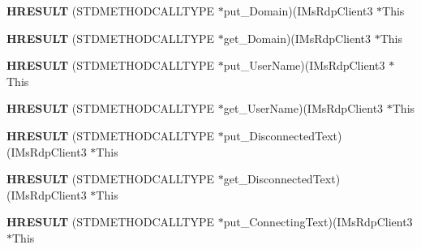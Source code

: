 \begin{DoxyCompactItemize}
\item 
\mbox{\label{struct_i_ms_rdp_client3_vtbl_a68a39d64ef2feeaec64359d9040c2900}} 
{\bfseries H\+R\+E\+S\+U\+LT} (S\+T\+D\+M\+E\+T\+H\+O\+D\+C\+A\+L\+L\+T\+Y\+PE $\ast$put\+\_\+\+Domain)(I\+Ms\+Rdp\+Client3 $\ast$This
\item 
\mbox{\label{struct_i_ms_rdp_client3_vtbl_a162188cb6b63060d59e2b48a63724153}} 
{\bfseries H\+R\+E\+S\+U\+LT} (S\+T\+D\+M\+E\+T\+H\+O\+D\+C\+A\+L\+L\+T\+Y\+PE $\ast$get\+\_\+\+Domain)(I\+Ms\+Rdp\+Client3 $\ast$This
\item 
\mbox{\label{struct_i_ms_rdp_client3_vtbl_ab4713d0f3b46d244f2354f8584dbf3dd}} 
{\bfseries H\+R\+E\+S\+U\+LT} (S\+T\+D\+M\+E\+T\+H\+O\+D\+C\+A\+L\+L\+T\+Y\+PE $\ast$put\+\_\+\+User\+Name)(I\+Ms\+Rdp\+Client3 $\ast$This
\item 
\mbox{\label{struct_i_ms_rdp_client3_vtbl_ac5b6d54c7b028ca96e798463299c6094}} 
{\bfseries H\+R\+E\+S\+U\+LT} (S\+T\+D\+M\+E\+T\+H\+O\+D\+C\+A\+L\+L\+T\+Y\+PE $\ast$get\+\_\+\+User\+Name)(I\+Ms\+Rdp\+Client3 $\ast$This
\item 
\mbox{\label{struct_i_ms_rdp_client3_vtbl_a2da64a1d57ca9485877e135c66893b18}} 
{\bfseries H\+R\+E\+S\+U\+LT} (S\+T\+D\+M\+E\+T\+H\+O\+D\+C\+A\+L\+L\+T\+Y\+PE $\ast$put\+\_\+\+Disconnected\+Text)(I\+Ms\+Rdp\+Client3 $\ast$This
\item 
\mbox{\label{struct_i_ms_rdp_client3_vtbl_a26a19d0c5dac866d2dab0d630399c2c9}} 
{\bfseries H\+R\+E\+S\+U\+LT} (S\+T\+D\+M\+E\+T\+H\+O\+D\+C\+A\+L\+L\+T\+Y\+PE $\ast$get\+\_\+\+Disconnected\+Text)(I\+Ms\+Rdp\+Client3 $\ast$This
\item 
\mbox{\label{struct_i_ms_rdp_client3_vtbl_aad5715381fe2c2c2d6c8e2dc1eb1b46f}} 
{\bfseries H\+R\+E\+S\+U\+LT} (S\+T\+D\+M\+E\+T\+H\+O\+D\+C\+A\+L\+L\+T\+Y\+PE $\ast$put\+\_\+\+Connecting\+Text)(I\+Ms\+Rdp\+Client3 $\ast$This
\item 
\mbox{\label{struct_i_ms_rdp_client3_vtbl_ae5f23abf553d35f6f20dd72a84878253}} 

\end{DoxyCompactItemize}
